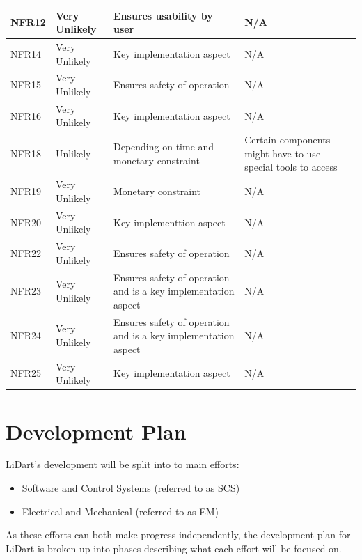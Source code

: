 \documentclass[12pt]{article}
\begin{document}
\begin{longtable}{ | p{2.3cm} | p{3.0cm} | p{4cm} | p{4cm} |}
\hline
NFR12 & Very Unlikely & Ensures usability by user & N/A \\
\hline
NFR14 & Very Unlikely & Key implementation aspect & N/A \\
\hline
NFR15 & Very Unlikely & Ensures safety of operation & N/A \\
\hline
NFR16 & Very Unlikely & Key implementation aspect & N/A \\
\hline
NFR18 & Unlikely & Depending on time and monetary constraint & Certain components might have to use special tools to access \\
\hline
NFR19 & Very Unlikely & Monetary constraint & N/A \\
\hline
NFR20 & Very Unlikcly & Key implementtion aspect & N/A \\
\hline
NFR22 & Very Unlikely & Ensures safety of operation & N/A \\
\hline
NFR23 & Very Unlikely & Ensures safety of operation and is a key implementation aspect & N/A \\
\hline
NFR24 & Very Unlikely & Ensures safety of operation and is a key implementation aspect & N/A \\
\hline
NFR25 & Very Unlikely & Key implementation aspect & N/A \\
\hline
\end{longtable}

\section{Development Plan}
\label{sec_dp}

LiDart's development will be split into to main efforts:
\begin{itemize}
    \item Software and Control Systems (referred to as SCS)
    \item Electrical and Mechanical (referred to as EM)
\end{itemize}

As these efforts can both make progress independently, the development plan for
LiDart is broken up into phases describing what each effort will be focused on.
\end{document}
